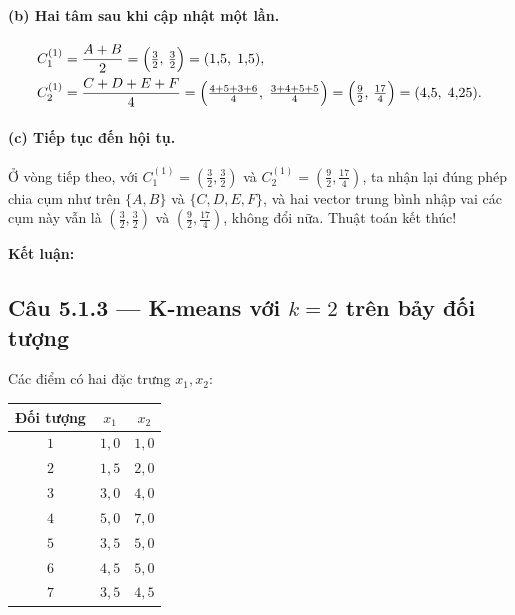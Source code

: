 \paragraph{(b) Hai tâm sau khi cập nhật một lần.}
\begin{align*}
C_1^{(1)} &= \frac{A+B}{2} = \Bigl(\tfrac32,\,\tfrac32\Bigr) = (1{,}5,\;1{,}5),\\
C_2^{(1)} &= \frac{C+D+E+F}{4}
           = \Bigl(\tfrac{4+5+3+6}{4},\;\tfrac{3+4+5+5}{4}\Bigr)
           = \Bigl(\tfrac92,\,\tfrac{17}{4}\Bigr)=(4{,}5,\;4{,}25).
\end{align*}

\paragraph{(c) Tiếp tục đến hội tụ.}
Ở vòng tiếp theo, với $C_1^{(1)}=(\frac32,\frac32)$ và $C_2^{(1)}=(\frac92,\frac{17}{4})$, ta nhận lại đúng phép chia cụm như trên $\{A,B\}$ và $\{C,D,E,F\}$, và hai vector trung bình nhập vai các cụm này vẫn là $(\frac32,\frac32)$ và $(\frac92,\frac{17}{4})$, không đổi nữa. Thuật toán kết thúc!

\textbf{Kết luận:}
\begin{center}
\end{center}

\subsection*{Câu 5.1.3 --- K-means với $k=2$ trên bảy đối tượng}

Các điểm có hai đặc trưng $x_1,x_2$:

\begin{center}
\begin{tabular}{@{}c cc@{}}
\toprule
Đối tượng & $x_1$ & $x_2$ \\
\midrule
$1$ & $1{,}0$ & $1{,}0$ \\
$2$ & $1{,}5$ & $2{,}0$ \\
$3$ & $3{,}0$ & $4{,}0$ \\
$4$ & $5{,}0$ & $7{,}0$ \\
$5$ & $3{,}5$ & $5{,}0$ \\
$6$ & $4{,}5$ & $5{,}0$ \\
$7$ & $3{,}5$ & $4{,}5$ \\
\bottomrule
\end{tabular}
\end{center}

